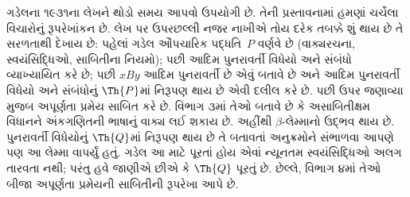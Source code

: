 \documentclass[../../../include/open-logic-section]{subfiles}
\begin{document}


ગડેલના ૧૯૩૧ના લેખને
થોડો સમય આપવો ઉપયોગી છે.
તેની પ્રસ્તાવનામાં હમણાં
ચર્ચેલા વિચારોનું રૂપરેખાંકન
છે. લેખ પર ઉપરછલ્લી
નજર નાખીએ તોય દરેક
તબક્કે શું થાય છે તે
સરળતાથી દેખાય છે:
પહેલાં ગડેલ ઔપચારિક
પદ્ધતિ~$P$ વર્ણવે છે
(વાક્યરચના, સ્વયંસિદ્ધિઓ,
સાબિતીના નિયમો); પછી
આદિમ પુનરાવર્તી વિધેયો
અને સંબંધો વ્યાખ્યાયિત
કરે છે; પછી $x B y$
આદિમ પુનરાવર્તી છે એવું
બતાવે છે અને આદિમ
પુનરાવર્તી વિધેયો અને
સંબંધોનું $\Th{P}$માં
નિરૂપણ થાય છે એવી
દલીલ કરે છે. પછી ઉપર
જણાવ્યા મુજબ અપૂર્ણતા
પ્રમેય સાબિત કરે છે.
વિભાગ ૩માં તેઓ બતાવે છે
કે અસાબિતીક્ષમ વિધાનને
અંકગણિતની ભાષાનું વાક્ય
લઈ શકાય છે. અહીંથી
$\beta$-લેમ્માનો ઉદ્ભવ
થાય છે. પુનરાવર્તી
વિધેયોનું $\Th{Q}$માં
નિરૂપણ થાય છે તે
બતાવતાં અનુક્રમોને
સંભાળવા આપણે પણ આ
લેમ્મા વાપર્યું હતું.
ગડેલ આ માટે પૂરતાં હોય
એવાં ન્યૂનતમ સ્વયંસિદ્ધિઓ
અલગ તારવતા નથી; પરંતુ
હવે જાણીએ છીએ કે
$\Th{Q}$ પૂરતું છે.
છેલ્લે, વિભાગ ૪માં
તેઓ બીજા અપૂર્ણતા
પ્રમેયની સાબિતીની
રૂપરેખા આપે છે.
\end{document}
